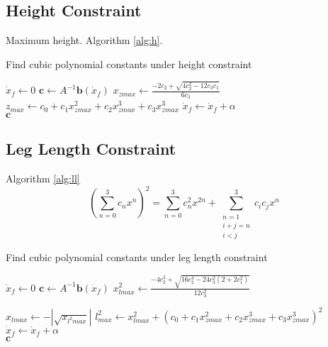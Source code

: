 \subsection{Height Constraint}
Maximum height. Algorithm \ref{alg:h}.
\begin{algorithm}
\caption{Find cubic polynomial constants under height constraint}
\label{alg:h}
\begin{algorithmic}[1]
    \State $\dot{x}_{f}\gets 0$
        \Repeat
            \State $\boldsymbol{c}\gets A^{-1}\boldsymbol{b}(\dot{x}_{f})$ 
            \State $x_{zmax}\gets \frac{-2c_2 + \sqrt{4c_2^2-12c_3c_1}}{6c_3}$ 
            \State $z_{max} \gets c_0 + c_1x_{zmax}^2 + c_2x_{zmax}^3+ c_3x_{zmax}^3$ 
            \State $\dot{x}_{f} \gets \dot{x}_{f}+\alpha$   
        \\
    \Return $\boldsymbol{c}$
    \EndProcedure       
\end{algorithmic}
\end{algorithm}

\subsection{Leg Length Constraint}
Algorithm \ref{alg:ll}
\begin{equation}
(\sum_{n=0}^3 c_n x^n)^2 = \sum_{n=0}^3 c_n^2 x^{2n} + \sum_{\substack{n=1 \\ i+j=n \\ i < j}}^3 c_i c_j x^n 
\end{equation}
\begin{algorithm}
\caption{Find cubic polynomial constants under leg length constraint}
\label{alg:ll}
\begin{algorithmic}[1]
    \State $\dot{x}_{f}\gets 0$
        \Repeat
            \State $\boldsymbol{c}\gets A^{-1}\boldsymbol{b}(\dot{x}_{f})$ 
            \State $x_{lmax}^2 \gets \frac{-4c_2^2+\sqrt{16c_2^4-24c_3^2(2+2c_1^2)}}{12c_3^2}$ 
            
            \State $x_{lmax}\gets-|\sqrt{x_{l^2max}}|$                
            \State $l_{max}^2 \gets x_{lmax}^2 + (c_0 + c_1x_{zmax}^2 + c_2x_{zmax}^3+ c_3x_{zmax}^3)^2$ 
            \State $\dot{x}_{f} \gets \dot{x}_{f}+\alpha$   
        \\
    \Return $\boldsymbol{c}$
    \EndProcedure       
\end{algorithmic}
\end{algorithm}

